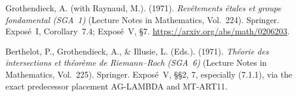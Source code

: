 \documentclass[11pt,a4paper]{article}
\begin{document}
Grothendieck, A. (with Raynaud, M.). (1971).
\emph{Rev\^etements \'etales et groupe fondamental (SGA~1)}
(Lecture Notes in Mathematics, Vol.~224). Springer.
Expos\'e~I, Corollary~7.4; Expos\'e~V, \S7.
\url{https://arxiv.org/abs/math/0206203}.

Berthelot, P., Grothendieck, A., \& Illusie, L. (Eds.). (1971).
\emph{Th\'eorie des intersections et th\'eor\`eme de Riemann--Roch
(SGA~6)} (Lecture Notes in Mathematics, Vol.~225). Springer.
Expos\'e~V, \S\S2, 7, especially (7.1.1), via the exact
predecessor placement AG-LAMBDA and MT-ART11.
\end{document}
